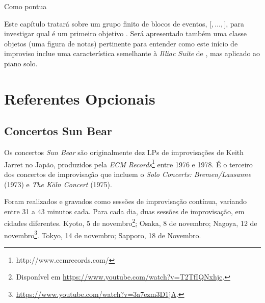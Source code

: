 Como pontua  

Este capítulo tratará sobre um grupo finito de blocos de eventos, $[$$,\ldots,$$]$, para investigar qual é um primeiro objetivo  . Será apresentado também uma classe objetos  (uma figura de notas) pertinente para entender como este início de improviso inclue uma característica  semelhante à \emph{Illiac Suite} de , mas aplicado ao piano solo. 

\section{Referentes Opcionais}\label{sec:sunbear}

\subsection{Concertos Sun Bear}\label{sec:sunbearanal}

Os concertos \emph{Sun Bear} são originalmente dez LPs  de improvisações de Keith Jarret no Japão, produzidos pela \emph{ECM Records}\footnote{http://www.ecmrecords.com/} entre 1976 e 1978. É o terceiro dos concertos de improvisação que incluem o \emph{Solo Concerts: Bremen/Lausanne} (1973) e \emph{The Köln Concert} (1975).

Foram realizados e gravados como sessões de improvisação contínua, variando entre 31 a 43 minutos cada. Para cada dia, duas sessões de improvisação, em cidades diferentes. Kyoto, 5 de novembro\footnote{Disponível em \url{https://www.youtube.com/watch?v=T2TfIQNxhjc}.}; Osaka, 8 de novembro; Nagoya, 12 de novembro\footnote{\url{https://www.youtube.com/watch?v=3a7ezm3D1jA}.}. Tokyo, 14 de novembro; Sapporo, 18 de Novembro.


